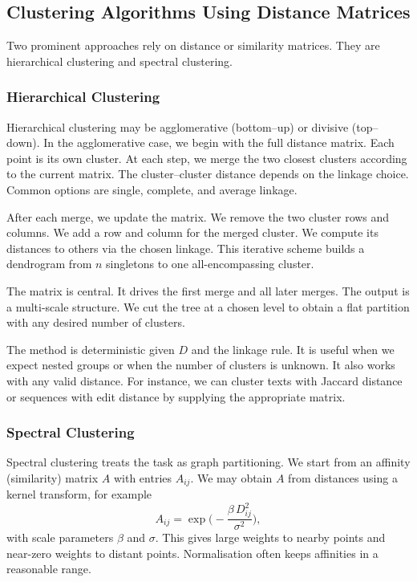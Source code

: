\subsection{Clustering Algorithms Using Distance Matrices}
Two prominent approaches rely on distance or similarity matrices. They are hierarchical clustering and spectral clustering.

\subsubsection{Hierarchical Clustering}
Hierarchical clustering may be agglomerative (bottom–up) or divisive (top–down). In the agglomerative case, we begin with the full distance matrix. Each point is its own cluster. At each step, we merge the two closest clusters according to the current matrix. The cluster–cluster distance depends on the linkage choice. Common options are single, complete, and average linkage.

After each merge, we update the matrix. We remove the two cluster rows and columns. We add a row and column for the merged cluster. We compute its distances to others via the chosen linkage. This iterative scheme builds a dendrogram from $n$ singletons to one all-encompassing cluster.

The matrix is central. It drives the first merge and all later merges. The output is a multi-scale structure. We cut the tree at a chosen level to obtain a flat partition with any desired number of clusters.

The method is deterministic given $D$ and the linkage rule. It is useful when we expect nested groups or when the number of clusters is unknown. It also works with any valid distance. For instance, we can cluster texts with Jaccard distance or sequences with edit distance by supplying the appropriate matrix.

\subsubsection{Spectral Clustering}
Spectral clustering treats the task as graph partitioning. We start from an affinity (similarity) matrix $A$ with entries $A_{ij}$. We may obtain $A$ from distances using a kernel transform, for example
\[
A_{ij}=\exp\!\Big(-\frac{\beta\,D_{ij}^2}{\sigma^2}\Big),
\]
with scale parameters $\beta$ and $\sigma$. This gives large weights to nearby points and near-zero weights to distant points. Normalisation often keeps affinities in a reasonable range.

